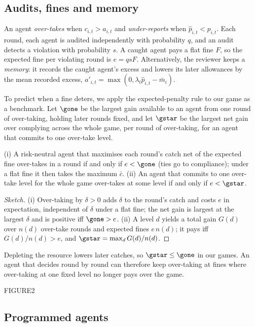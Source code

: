 \subsection{Audits, fines and memory}

An agent \emph{over-takes} when $c_{i,t}>a_{i,t}$ and \emph{under-reports} when $\hat p_{i,t}<p_{i,t}$. Each round, each agent is audited independently with probability $q$, and an audit detects a violation with probability $s$. A caught agent pays a flat fine $F$, so the expected fine per violating round is $e=qsF$. Alternatively, the reviewer keeps a \emph{memory}: it records the caught agent's excess and lowers its later allowances by the mean recorded excess, $a'_{i,t}=\max(0,\lambda_t\hat p_{i,t}-\bar m_i)$.

To predict when a fine deters, we apply the expected-penalty rule \citep{becker1968crime} to our game as a benchmark. Let $\gone$ be the largest gain available to an agent from one round of over-taking, holding later rounds fixed, and let $\gstar$ be the largest net gain over complying across the whole game, per round of over-taking, for an agent that commits to one over-take level.

\begin{proposition}
\label{prop:breakeven}
(i) A risk-neutral agent that maximises each round's catch net of the expected fine over-takes in a round if and only if $e<\gone$ (ties go to compliance); under a flat fine it then takes the maximum $\bar c$. (ii) An agent that commits to one over-take level for the whole game over-takes at some level if and only if $e<\gstar$.
\end{proposition}
\begin{proof}[Sketch]
(i) Over-taking by $\delta>0$ adds $\delta$ to the round's catch and costs $e$ in expectation, independent of $\delta$ under a flat fine; the net gain is largest at the largest $\delta$ and is positive iff $\gone>e$. (ii) A level $d$ yields a total gain $G(d)$ over $n(d)$ over-take rounds and expected fines $e\,n(d)$; it pays iff $G(d)/n(d)>e$, and $\gstar=\max_d G(d)/n(d)$.
\end{proof}

Depleting the resource lowers later catches, so $\gstar\le\gone$ in our games. An agent that decides round by round can therefore keep over-taking at fines where over-taking at one fixed level no longer pays over the game.

FIGURE2

\subsection{Programmed agents}

